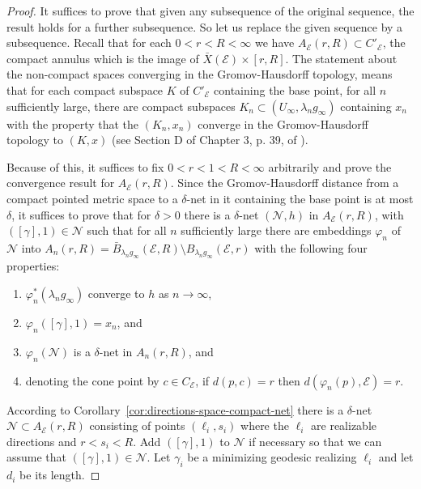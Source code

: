 \begin{proof}
\sketch
{}
It suffices to prove that given any subsequence of the original
sequence, the result holds for a further subsequence. So let us
replace the given sequence by a subsequence. Recall that for each
$0<r<R<\infty$ we have $A_{\mathcal E}(r,R)\subset C'_{\mathcal E}$,
the compact annulus which is the image of $\bar X({\mathcal
E})\times [r,R]$. The statement about the non-compact spaces
converging in the Gromov-Hausdorff topology, means that for each
compact subspace $K$ of $ C'_{\mathcal E}$ containing the base
point, for all $n$ sufficiently large, there are compact subspaces
$K_n\subset (U_\infty,\lambda_ng_\infty)$ containing $x_n$ with the
property that the $(K_n,x_n)$ converge in the Gromov-Hausdorff
topology to $(K,x)$ (see Section D of Chapter 3, p. 39, of
\cite{Gromov}).

Because of this, it suffices to  fix $0<r<1<R<\infty$ arbitrarily
and prove the convergence result for $A_{\mathcal E}(r,R)$. Since
the Gromov-Hausdorff distance from a compact pointed metric space to
a $\delta$-net in it containing the base point is at most $\delta$,
it suffices to prove that for $\delta>0$ there is a $\delta$-net
$({\mathcal N},h)$ in $A_{\mathcal E}(r,R)$, with $([\gamma],1)\in
{\mathcal N}$ such that for all $n$ sufficiently large there are
embeddings $\varphi_n$ of ${\mathcal N}$ into $A_n(r,R)=\bar
B_{\lambda_ng_\infty}({\mathcal E},R)\setminus
B_{\lambda_ng_\infty}({\mathcal E},r)$  with the following four
properties:
\begin{enumerate}
\item[(1)]  $\varphi_n^*(\lambda_ng_\infty)$ converge to $h$ as $n\rightarrow\infty$,
\item[(2)] $\varphi_n([\gamma],1)=x_n$,
and
\item[(3)]  $\varphi_n({\mathcal N})$ is a $\delta$-net in $A_n(r,R)$, and
\item[(4)] denoting the cone point by $c\in C_{\mathcal E}$,
if $d(p,c)=r$ then $d(\varphi_n(p),{\mathcal E})=r$.
\end{enumerate}

According to Corollary~\ref{cor:directions-space-compact-net} there is a $\delta$-net
${\mathcal N}\subset A_{\mathcal E}(r,R)$ consisting of points
$(\ell_i,s_i)$ where the $\ell_i$ are realizable directions and
$r<s_i< R$. Add $([\gamma],1)$ to ${\mathcal N}$ if necessary so
that we can assume that $([\gamma],1)\in {\mathcal N}$. Let
$\gamma_i$ be a minimizing geodesic realizing $\ell_i$ and let $d_i$
be its length.


\end{proof}
